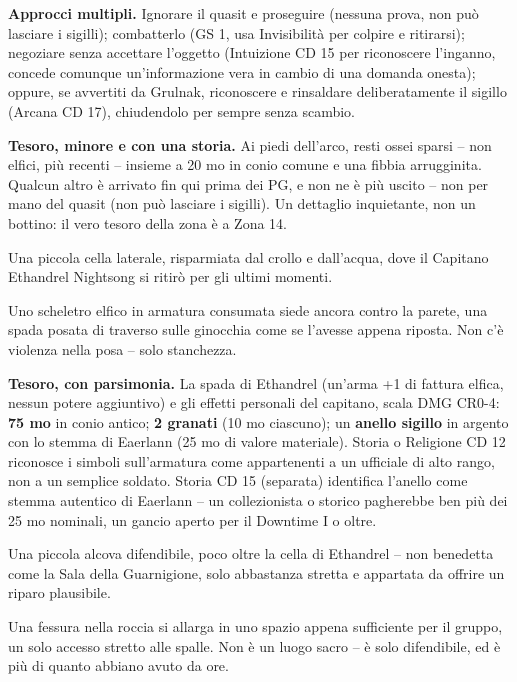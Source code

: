 \textbf{Approcci multipli.} Ignorare il quasit e proseguire (nessuna prova, non può lasciare i sigilli); combatterlo (GS 1, usa Invisibilità per colpire e ritirarsi); negoziare senza accettare l'oggetto (Intuizione CD 15 per riconoscere l'inganno, concede comunque un'informazione vera in cambio di una domanda onesta); oppure, se avvertiti da Grulnak, riconoscere e rinsaldare deliberatamente il sigillo (Arcana CD 17), chiudendolo per sempre senza scambio.

\textbf{Tesoro, minore e con una storia.} Ai piedi dell'arco, resti ossei sparsi -- non elfici, più recenti -- insieme a 20 mo in conio comune e una fibbia arrugginita. Qualcun altro è arrivato fin qui prima dei PG, e non ne è più uscito -- non per mano del quasit (non può lasciare i sigilli). Un dettaglio inquietante, non un bottino: il vero tesoro della zona è a Zona 14.


Una piccola cella laterale, risparmiata dal crollo e dall'acqua, dove il Capitano Ethandrel Nightsong si ritirò per gli ultimi momenti.

\begin{DndReadAloud}[]
  Uno scheletro elfico in armatura consumata siede ancora contro la parete, una spada posata di traverso sulle ginocchia come se l'avesse appena riposta. Non c'è violenza nella posa -- solo stanchezza.
\end{DndReadAloud}

\textbf{Tesoro, con parsimonia.} La spada di Ethandrel (un'arma +1 di fattura elfica, nessun potere aggiuntivo) e gli effetti personali del capitano, scala DMG CR0-4: \textbf{75 mo} in conio antico; \textbf{2 granati} (10 mo ciascuno); un \textbf{anello sigillo} in argento con lo stemma di Eaerlann (25 mo di valore materiale). Storia o Religione CD 12 riconosce i simboli sull'armatura come appartenenti a un ufficiale di alto rango, non a un semplice soldato. Storia CD 15 (separata) identifica l'anello come stemma autentico di Eaerlann -- un collezionista o storico pagherebbe ben più dei 25 mo nominali, un gancio aperto per il Downtime I o oltre.


Una piccola alcova difendibile, poco oltre la cella di Ethandrel -- non benedetta come la Sala della Guarnigione, solo abbastanza stretta e appartata da offrire un riparo plausibile.

\begin{DndReadAloud}[]
  Una fessura nella roccia si allarga in uno spazio appena sufficiente per il gruppo, un solo accesso stretto alle spalle. Non è un luogo sacro -- è solo difendibile, ed è più di quanto abbiano avuto da ore.
\end{DndReadAloud}

